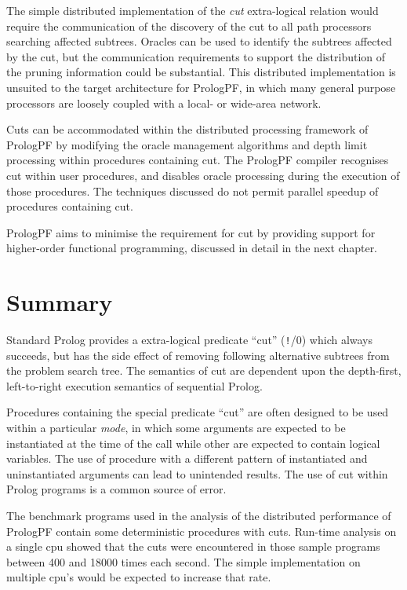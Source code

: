 The simple distributed implementation of the \textit{cut} extra-logical relation would require
the communication of the discovery of the cut to all path processors searching affected
subtrees.  Oracles can be used to identify the subtrees affected by the cut, but the
communication requirements to support the distribution of the pruning information could
be substantial.  This distributed implementation is unsuited to the target architecture for
PrologPF, in which many general purpose processors are loosely coupled with a local- or
wide-area network.

Cuts can be accommodated within the distributed processing framework of PrologPF by modifying
the oracle management algorithms and depth limit processing within procedures containing
cut.  The PrologPF compiler recognises cut within user procedures, and disables oracle
processing during the execution of those procedures.  The techniques discussed do not permit
parallel speedup of procedures containing cut.

PrologPF aims to minimise the requirement for cut by providing support for higher-order
functional programming, discussed in detail in the next chapter.

\section{Summary} %

Standard Prolog \cite{DEDC96} provides a extra-logical predicate ``cut''
(\texttt{!}/0) which always succeeds, but has the side effect of
removing following alternative subtrees from the problem search tree.
The semantics of cut are dependent upon the depth-first, left-to-right
execution semantics of sequential Prolog.

Procedures containing the special predicate ``cut'' are often designed to be used within
a particular \textit{mode}, in which some arguments are expected to be instantiated at
the time of the call while other are expected to contain logical variables.  The use
of procedure with a different pattern of instantiated and uninstantiated arguments can
lead to unintended results.  The use of cut within Prolog programs is a common
source of error.

The benchmark programs used in the analysis of the distributed performance of PrologPF
contain some deterministic procedures with cuts.  Run-time analysis on a single cpu
showed that the cuts were encountered in those sample programs between 400 and 18000 times
each second.  The simple implementation on multiple cpu's would be expected to increase
that rate.

